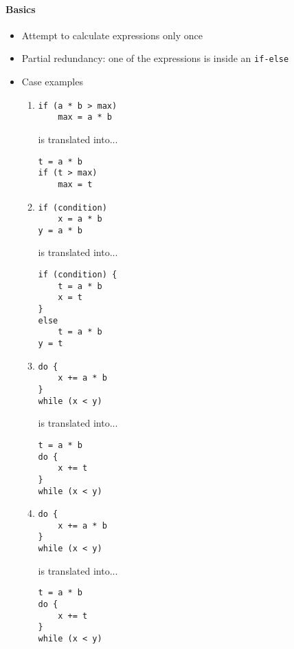 \documentclass[a4paper,12pt, notitlepage]{article}
\begin{document}
\paragraph*{Basics}
\begin{itemize}
\item Attempt to calculate expressions only once
\item Partial redundancy: one of the expressions is inside an \texttt{if-else}
\item Case examples
    \begin{enumerate}
        \item 
        \begin{verbatim}
if (a * b > max)
    max = a * b
        \end{verbatim} \vspace{-0.5cm}
        is translated into...
        \begin{verbatim}
t = a * b
if (t > max)
    max = t
        \end{verbatim} \vspace{-0.5cm}
        \item 
        \begin{verbatim}
if (condition)
    x = a * b
y = a * b
        \end{verbatim} \vspace{-0.5cm}
        is translated into...
        \begin{verbatim}
if (condition) {
    t = a * b
    x = t
}
else
    t = a * b
y = t
        \end{verbatim} \vspace{-0.5cm}
        \item 
        \begin{verbatim}
do {
    x += a * b
}
while (x < y)
        \end{verbatim} \vspace{-0.5cm}
        is translated into...
        \begin{verbatim}
t = a * b
do {
    x += t
}
while (x < y)
        \end{verbatim} \vspace{-0.5cm}
        \pagebreak
        \item 
        \begin{verbatim}
do {
    x += a * b
}
while (x < y)
        \end{verbatim} \vspace{-0.5cm}
        is translated into...
        \begin{verbatim}
t = a * b
do {
    x += t
}
while (x < y)

\end{verbatim}
\end{enumerate}
\end{itemize}
\end{document}
